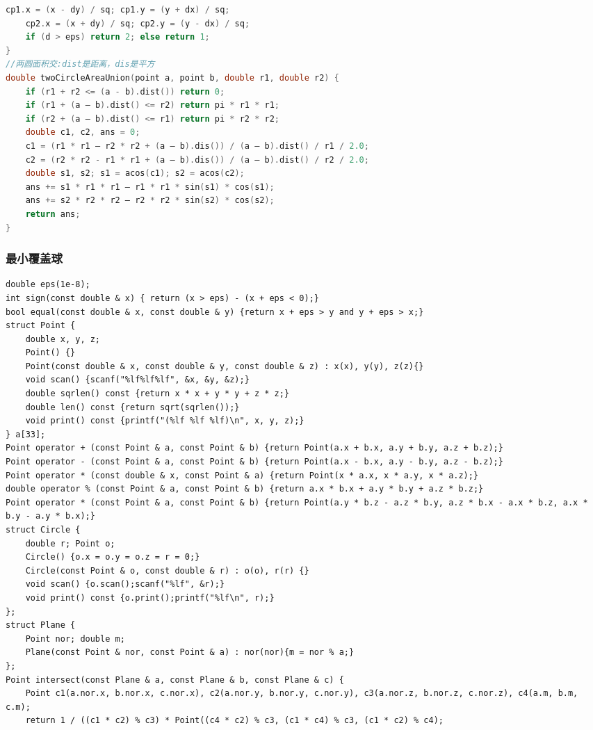 \documentclass[landscape,a4paper]{article}
\begin{document}
\begin{spacing}{0.3}
\begin{multicols}{2}
\begin{lstlisting}[language=C++]
	cp1.x = (x - dy) / sq; cp1.y = (y + dx) / sq;
	cp2.x = (x + dy) / sq; cp2.y = (y - dx) / sq;
	if (d > eps) return 2; else return 1;
}
//两圆面积交:dist是距离，dis是平方
double twoCircleAreaUnion(point a, point b, double r1, double r2) {
	if (r1 + r2 <= (a - b).dist()) return 0;
	if (r1 + (a – b).dist() <= r2) return pi * r1 * r1;
	if (r2 + (a – b).dist() <= r1) return pi * r2 * r2;
	double c1, c2, ans = 0;
	c1 = (r1 * r1 – r2 * r2 + (a – b).dis()) / (a – b).dist() / r1 / 2.0;
	c2 = (r2 * r2 - r1 * r1 + (a – b).dis()) / (a – b).dist() / r2 / 2.0;
	double s1, s2; s1 = acos(c1); s2 = acos(c2);
	ans += s1 * r1 * r1 – r1 * r1 * sin(s1) * cos(s1);
	ans += s2 * r2 * r2 – r2 * r2 * sin(s2) * cos(s2);
	return ans;
}
\end{lstlisting}
\subsubsection{最小覆盖球}
\begin{lstlisting}
double eps(1e-8);
int sign(const double & x) { return (x > eps) - (x + eps < 0);}
bool equal(const double & x, const double & y) {return x + eps > y and y + eps > x;}
struct Point {
	double x, y, z;
	Point() {}
	Point(const double & x, const double & y, const double & z) : x(x), y(y), z(z){}
	void scan() {scanf("%lf%lf%lf", &x, &y, &z);}
	double sqrlen() const {return x * x + y * y + z * z;}
	double len() const {return sqrt(sqrlen());}
	void print() const {printf("(%lf %lf %lf)\n", x, y, z);}
} a[33];
Point operator + (const Point & a, const Point & b) {return Point(a.x + b.x, a.y + b.y, a.z + b.z);}
Point operator - (const Point & a, const Point & b) {return Point(a.x - b.x, a.y - b.y, a.z - b.z);}
Point operator * (const double & x, const Point & a) {return Point(x * a.x, x * a.y, x * a.z);}
double operator % (const Point & a, const Point & b) {return a.x * b.x + a.y * b.y + a.z * b.z;}
Point operator * (const Point & a, const Point & b) {return Point(a.y * b.z - a.z * b.y, a.z * b.x - a.x * b.z, a.x * b.y - a.y * b.x);}
struct Circle {
	double r; Point o;
	Circle() {o.x = o.y = o.z = r = 0;}
	Circle(const Point & o, const double & r) : o(o), r(r) {}
	void scan() {o.scan();scanf("%lf", &r);}
	void print() const {o.print();printf("%lf\n", r);}
};
struct Plane {
	Point nor; double m;
	Plane(const Point & nor, const Point & a) : nor(nor){m = nor % a;}
};
Point intersect(const Plane & a, const Plane & b, const Plane & c) {
	Point c1(a.nor.x, b.nor.x, c.nor.x), c2(a.nor.y, b.nor.y, c.nor.y), c3(a.nor.z, b.nor.z, c.nor.z), c4(a.m, b.m, c.m);
	return 1 / ((c1 * c2) % c3) * Point((c4 * c2) % c3, (c1 * c4) % c3, (c1 * c2) % c4);

\end{lstlisting}
\end{multicols}
\end{spacing}
\end{document}
